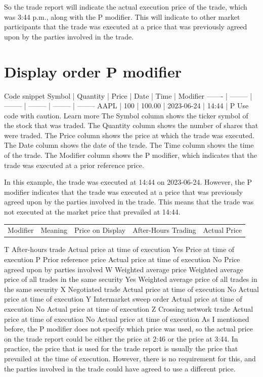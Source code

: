 \documentclass[11pt]{article}
\begin{document}
So the trade report will indicate the actual execution price of the trade, which was 3:44 p.m., along with the P modifier. This will indicate to other market participants that the trade was executed at a price that was previously agreed upon by the parties involved in the trade.

\section{Display order  P modifier}
\label{sec:org1e2b14e}


Code snippet
Symbol | Quantity | Price | Date | Time | Modifier
------- | -------- | -------- | -------- | -------- | --------
AAPL | 100 | 100.00 | 2023-06-24 | 14:44 | P
Use code with caution. Learn more
The Symbol column shows the ticker symbol of the stock that was traded. The Quantity column shows the number of shares that were traded. The Price column shows the price at which the trade was executed. The Date column shows the date of the trade. The Time column shows the time of the trade. The Modifier column shows the P modifier, which indicates that the trade was executed at a prior reference price.

In this example, the trade was executed at 14:44 on 2023-06-24. However, the P modifier indicates that the trade was executed at a price that was previously agreed upon by the parties involved in the trade. This means that the trade was not executed at the market price that prevailed at 14:44.





\begin{center}
\begin{tabular}{lllll}
Modifier & Meaning & Price on Display & After-Hours Trading & Actual Price\\[0pt]
\end{tabular}
\end{center}
T	After-hours trade	Actual price at time of execution	Yes	Price at time of execution
P	Prior reference price	Actual price at time of execution	No	Price agreed upon by parties involved
W	Weighted average price	Weighted average price of all trades in the same security	Yes	Weighted average price of all trades in the same security
X	Negotiated trade	Actual price at time of execution	No	Actual price at time of execution
Y	Intermarket sweep order	Actual price at time of execution	No	Actual price at time of execution
Z	Crossing network trade	Actual price at time of execution	No	Actual price at time of execution
As I mentioned before, the P modifier does not specify which price was used, so the actual price on the trade report could be either the price at 2:46 or the price at 3:44. In practice, the price that is used for the trade report is usually the price that prevailed at the time of execution. However, there is no requirement for this, and the parties involved in the trade could have agreed to use a different price.
\end{document}
